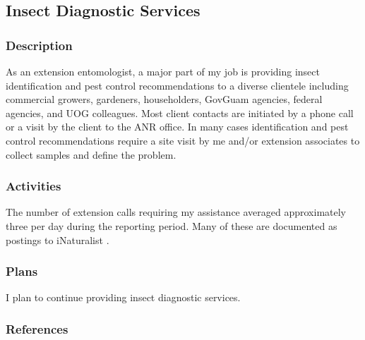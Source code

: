 \subsection{Insect Diagnostic Services}
\begin{refsection}

\subsubsection{Description}	
As an extension entomologist, a major part of my job is providing
insect identification and pest control recommendations to a diverse
clientele including commercial growers, gardeners, householders, GovGuam
agencies, federal agencies, and UOG colleagues. Most client contacts
are initiated by a phone call or a visit by the client to the ANR
office. In many cases identification and pest control recommendations
require a site visit by me and/or extension associates to collect
samples and define the problem.

\subsubsection{Activities}

The number of extension calls requiring my assistance averaged approximately
three per day during the reporting period. Many of these are documented
as postings to iNaturalist \cite{moore_aubrey_2020}.

\subsubsection{Plans}

I plan to continue providing insect diagnostic services.

\subsubsection{References}
\printbibliography[heading=none]
\end{refsection}


